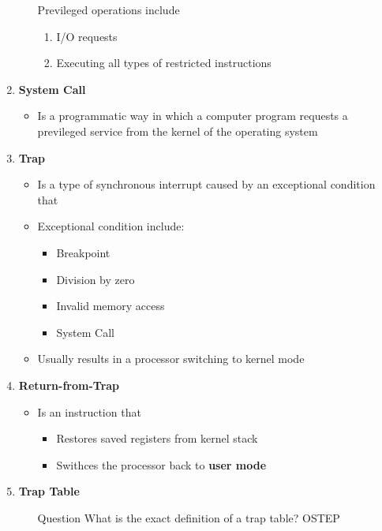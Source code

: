 \documentclass[12pt]{article}
\begin{document}
\begin{mdframed}
\begin{enumerate}[1.]
\begin{itemize}
        \bigskip

        Previleged operations include

        \begin{enumerate}[1.]
            \item I/O requests
            \item Executing all types of restricted instructions
        \end{enumerate}
    \end{itemize}
    \item \textbf{System Call}
    \begin{itemize}
        \item Is a programmatic way in which a computer program requests a previleged
        service from the kernel of the operating system
    \end{itemize}
    \item \textbf{Trap}
    \begin{itemize}
        \item Is a type of synchronous interrupt caused by an exceptional condition that
        \item Exceptional condition include:
        \begin{itemize}
            \item Breakpoint
            \item Division by zero
            \item Invalid memory access
            \item System Call
        \end{itemize}
        \item Usually results in a processor switching to kernel mode
    \end{itemize}
    \item \textbf{Return-from-Trap}
    \begin{itemize}
        \item Is an instruction that
        \begin{itemize}
            \item Restores saved registers from kernel stack
            \item Swithces the processor back to \textbf{user mode}
        \end{itemize}
    \end{itemize}
    \item \textbf{Trap Table}
    \begin{itemize}
        \item [\color{blue}Question\color{black}] What is the exact definition of a trap table? OSTEP

\end{itemize}
\end{enumerate}
\end{mdframed}
\end{document}

